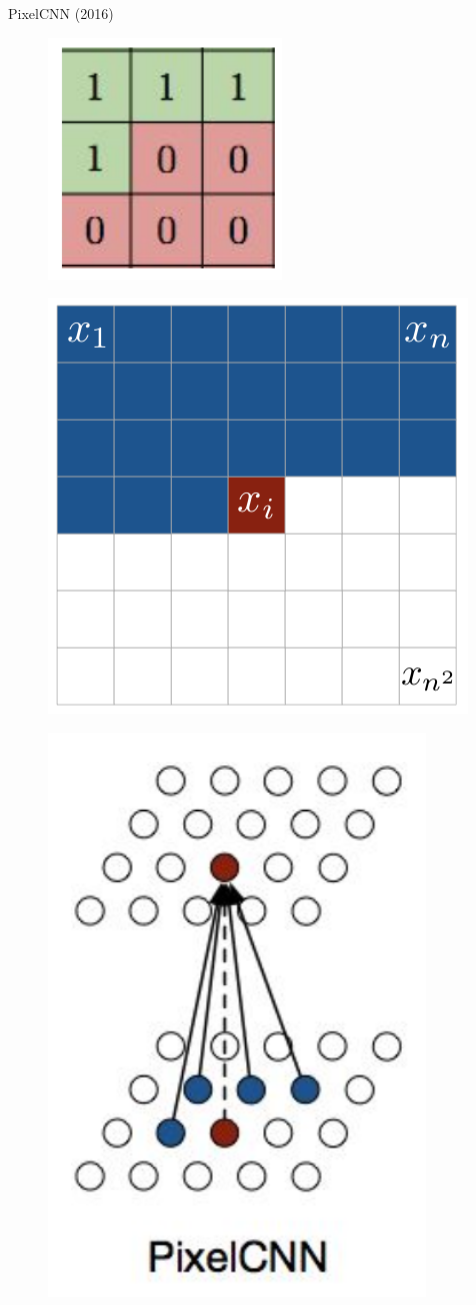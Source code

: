 \documentclass{beamer}
\begin{document}
\begin{frame}{PixelCNN (2016)}
\begin{minipage}[t]{0.5\columnwidth}
	\begin{figure}[h]
		\centering
        \includegraphics[width=0.35\linewidth]{figs/pixelcnn_0_1.png}
	\end{figure}
	\vspace{-0.1cm}
	\begin{figure}[h]
		\centering
        \includegraphics[width=0.7\linewidth]{figs/pixelcnn1.png}
	\end{figure}
	\end{minipage}%
	\begin{minipage}[t]{0.5\columnwidth}
	\begin{figure}[h]
		\centering
        \includegraphics[width=0.5\linewidth]{figs/pixelcnn_0_2.png}

\end{figure}
\end{minipage}
\end{frame}
\end{document}
